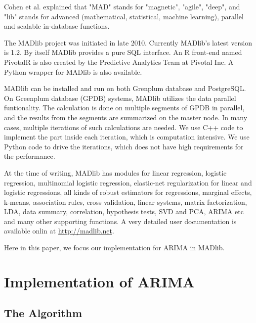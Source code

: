 \documentclass[english,12pt]{article}
\theoremstyle{algorithm}
\begin{document}
Cohen et al. \cite{mad-skills} explained that "MAD" stands for "magnetic",
"agile", "deep", and "lib" stands for advanced (mathematical, statistical,
machine learning), parallel and scalable in-database functions.

The MADlib project was initiated in late 2010. Currently MADlib's latest
version is 1.2. By itself MADlib provides a pure SQL interface. An R front-end
named PivotalR \cite{pivotalr} is also created by the Predictive Analytics Team
at Pivotal Inc. A Python wrapper \cite{python-madlib} for MADlib is also
available.

MADlib can be installed and run on both Grenplum database and PostgreSQL\@. On
Greenplum database (GPDB) systems, MADlib utilizes the data parallel
funtionality. The calculation is done on multiple segments of GPDB in parallel,
and the results from the segments are summarized on the master node. In many
cases, multiple iterations of such calculations are needed. We use C++ code to
implement the part inside each iteration, which is computation intensive. We
use Python code to drive the iterations, which does not have high requirements
for the performance.



At the time of writing, MADlib has modules for linear regression, logistic
regression, multinomial logistic regression, elastic-net regularization for
linear and logistic regressions, all kinds of robust estimators for
regressions, marginal effects, k-means, association rules, cross validation,
linear systems, matrix factorization, LDA, data summary, correlation,
hypothesis tests, SVD and PCA, ARIMA etc and many other supporting functions.
A very detailed user documentation is available onlin at
\url{http://madlib.net}.

Here in this paper, we focus our implementation for ARIMA in MADlib.

\section{Implementation of ARIMA}


\subsection{The Algorithm}

\end{document}
